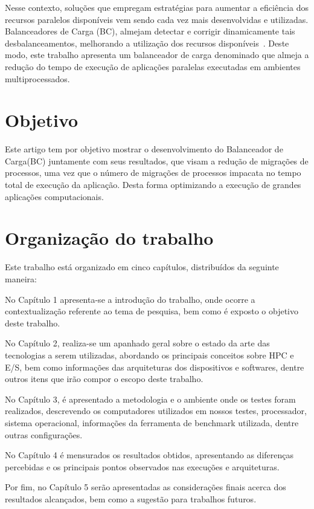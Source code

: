Nesse contexto, soluções que empregam estratégias para aumentar a eficiência dos recursos paralelos disponíveis vem sendo cada vez mais desenvolvidas e utilizadas. Balanceadores de Carga (BC), almejam detectar e corrigir dinamicamente tais desbalanceamentos, melhorando a utilização dos recursos disponíveis~\cite{viniciusWSCAD2017}. Deste modo, este trabalho apresenta um balanceador de carga denominado \newlb que almeja a redução do tempo de execução de aplicações paralelas executadas em ambientes multiprocessados.

\section{Objetivo}

Este artigo tem por objetivo mostrar o desenvolvimento do Balanceador de Carga(BC) \newlb juntamente com seus resultados, que visam a redução de migrações de processos, uma vez que o número de migrações de processos impacata no tempo total de execução da aplicação. Desta forma optimizando a execução de grandes aplicações computacionais.  

\section{Organização do trabalho}

Este trabalho está organizado em cinco capítulos, distribuídos da seguinte maneira: 

No Capítulo 1 apresenta-se a introdução do trabalho, onde ocorre a contextualização referente ao tema de pesquisa, bem como é exposto o objetivo deste trabalho.

No Capítulo 2, realiza-se um apanhado geral sobre o estado da arte das tecnologias a serem utilizadas, abordando os principais conceitos sobre HPC e E/S, bem como informações das arquiteturas dos dispositivos e softwares, dentre outros itens que irão compor o escopo deste trabalho.

No Capítulo 3, é apresentado a metodologia e o ambiente onde os testes foram realizados, descrevendo  os computadores utilizados em nossos testes, processador, sistema operacional, informações da ferramenta de benchmark utilizada, dentre outras configurações.

No Capítulo 4 é mensurados os resultados obtidos, apresentando as diferenças percebidas e os principais pontos observados nas execuções e arquiteturas.

Por fim, no Capítulo 5 serão apresentadas as considerações finais acerca dos resultados alcançados, bem como a sugestão para trabalhos futuros.